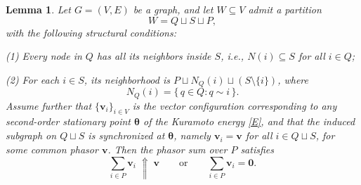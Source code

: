 \documentclass[11pt,reqno]{amsart}
\newtheorem{lemma}[theorem]{Lemma}
\theoremstyle{definition}
\begin{document}
\begin{lemma}\label{lem:sync-implies-common-alignment}
Let $G=(V,E)$ be a graph, and let $W \subseteq V$ admit a partition
\[
W = Q \sqcup S \sqcup P,
\]
with the following structural conditions:

(1) Every node in $Q$ has all its neighbors inside $S$, 
    i.e., $N(i) \subseteq S$ for all $i \in Q$;

(2) For each $i \in S$, its neighborhood is 
    $P \sqcup N_Q(i) \sqcup (S \setminus \{i\})$, 
    where $$N_Q(i) = \{\, q \in Q : q \sim i \,\}.$$
Assume further that $\{\boldsymbol{v}_i\}_{i \in V}$ is the vector configuration corresponding to any second-order stationary point $\boldsymbol{\theta}$ of the Kuramoto energy \eqref{E}, and that the induced subgraph on $Q \sqcup S$ is synchronized at $\boldsymbol{\theta}$, namely
$\boldsymbol{v}_i = \boldsymbol{v}$ for all $i \in Q \sqcup S$, for some common phasor $\boldsymbol{v}$.
Then the phasor sum over $P$ satisfies
\[
\sum_{i \in P} \boldsymbol{v}_i \; \Uparrow \; \boldsymbol{v}
\qquad \text{or} \qquad
\sum_{i \in P} \boldsymbol{v}_i = \boldsymbol{0}.
\]
\end{lemma}
\end{document}

